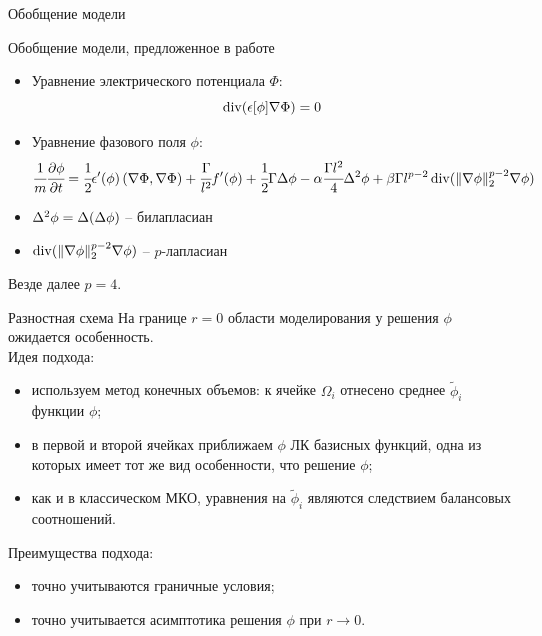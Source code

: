 \begin{frame}{Обобщение модели}
\vspace{-0.3cm}
\begin{block}{Обобщение модели, предложенное в работе \cite{zipunova_higher_codimension}}
\begin{itemize}
	\item Уравнение электрического потенциала $\Phi$:
	$$\operatorname{{div}}(\epsilon[\phi] \nabla \Phi) = 0$$
	\item Уравнение фазового поля $\phi$:
	$$\cfrac{1}{m} \cfrac{\partial \phi}{\partial t} = \cfrac{1}{2} \epsilon'(\phi) \left( \nabla \Phi, \nabla \Phi \right) + \cfrac{\Gamma}{l^2} f'(\phi) + \cfrac{1}{2} \Gamma \Delta \phi - \alpha \cfrac{\Gamma l^2}{4} \Delta^2 \phi + \beta \Gamma l^{p - 2} \operatorname{{div}}(\| \nabla \phi \|_2^{p - 2} \nabla \phi)$$
\end{itemize}
\end{block}
\begin{itemize}
	\item $\Delta^2 \phi = \Delta(\Delta \phi)$ -- билапласиан
	\item $\operatorname{{div}}(\| \nabla \phi \|_2^{p - 2} \nabla \phi)$ -- $p$-лапласиан
\end{itemize}
Везде далее $p = 4$.
\end{frame}


\begin{frame}{Разностная схема}
На границе $r = 0$ области моделирования у решения $\phi$ ожидается особенность. \\
Идея подхода:
\begin{itemize}
	\item используем метод конечных объемов: к ячейке $\Omega_i$ отнесено среднее
	$\widetilde{\phi}_i$ функции $\phi$;
	\item в первой и второй ячейках приближаем $\phi$ ЛК базисных функций, одна из которых имеет
	тот же вид особенности, что решение $\phi$;
	\item как и в классическом МКО, уравнения на $\widetilde{\phi}_i$ являются следствием
	балансовых соотношений.
\end{itemize}
Преимущества подхода:
\begin{itemize}
	\item точно учитываются граничные условия;
	\item точно учитывается асимптотика решения $\phi$ при $r \to 0$.
\end{itemize}
\end{frame}


